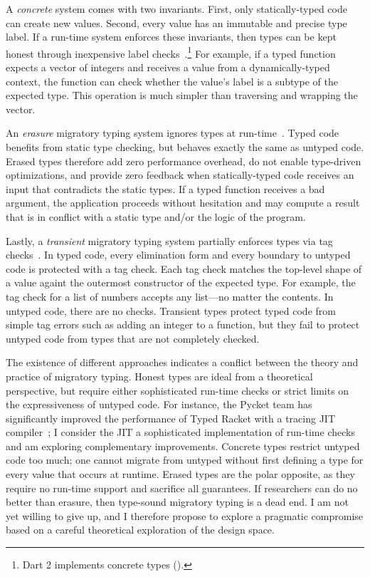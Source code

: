 A \emph{concrete}\/ system comes with two invariants.
First, only statically-typed code can create new values.
Second, every value has an immutable and precise type label.
If a run-time system enforces these invariants, then types can be kept honest
 through inexpensive label checks~\cite{mt-oopsla-2017,wnlov-popl-2010,bmt-ecoop-2010,rat-oopsla-2017}.\footnote{Dart 2 implements concrete types ().}
For example, if a typed function expects a vector of integers and receives
 a value from a dynamically-typed context, the function can check whether the
 value's label is a subtype of the expected type.
This operation is much simpler than traversing and wrapping the vector.

An \emph{erasure}\/ migratory typing system ignores types at run-time~\cite{bat-ecoop-2014,bg-oopsla-1993,s-lisp-1990}.
Typed code benefits from static type checking, but behaves exactly the same
 as untyped code.
Erased types therefore add zero performance overhead, do not enable
 type-driven optimizations, and provide zero feedback
 when statically-typed code receives an input that contradicts the static
 types.
If a typed function receives a bad argument, the application proceeds without
 hesitation and may compute a result that is in conflict with a
 static type and/or the logic of the program.

Lastly, a \emph{transient}\/ migratory typing system partially enforces types
 via tag checks~\cite{vss-popl-2017,v-thesis-2019}.
In typed code, every elimination form and every boundary to untyped code
 is protected with a tag check.
Each tag check matches the top-level shape of a value againt the outermost
 constructor of the expected type.
For example, the tag check for a
 list of numbers accepts any list---no matter the contents.
In untyped code, there are no checks.
Transient types protect typed code from simple
 tag errors such as adding an integer to a function, but they fail
 to protect untyped code from types that are not completely checked.

The existence of different approaches indicates a conflict between the theory
 and practice of migratory typing.
Honest types are ideal from a theoretical perspective, but require either
 sophisticated run-time checks or strict limits on the expressiveness of
 untyped code.
For instance, the Pycket team has significantly improved the performance
 of Typed Racket with a tracing JIT compiler~\cite{bbst-oopsla-2017};
 I consider the JIT a sophisticated implementation of run-time checks
 and am exploring complementary improvements.
Concrete types restrict untyped code too much; one cannot migrate from untyped
 without first defining a type for every value that occurs at runtime.
Erased types are the polar opposite, as they require no run-time support
 and sacrifice all guarantees.
If researchers can do no better than erasure, then
 type-sound migratory typing is a dead end.
I am not yet willing to give up, and I therefore propose to explore a pragmatic
 compromise based on a careful theoretical exploration of the design space.

